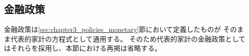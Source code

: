 
\subsection{金融政策}
\label{sec:chapter3_representative_household_monetary_policies}
金融政策は\ref{sec:chapter3_policies_monetary}節において定義したものが
そのまま代表的家計の方程式として通用する。
そのため代表的家計の金融政策としてはそれらを採用し、本節における再掲は省略する。